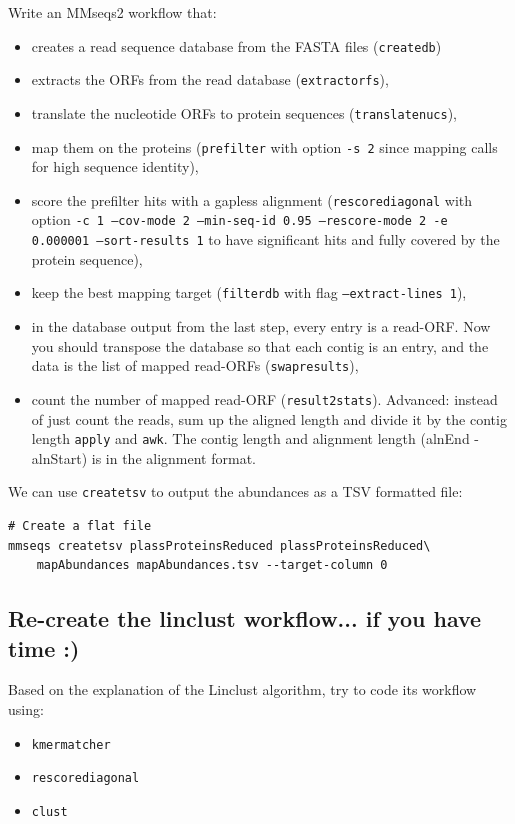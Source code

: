 \documentclass{scrartcl}
\begin{document}
Write an MMseqs2 workflow that:
\begin{itemize}
    \item creates a read sequence database from the FASTA files (\texttt{createdb})
    \item extracts the ORFs from the read database (\texttt{extractorfs}),
    \item translate the nucleotide ORFs to protein sequences (\texttt{translatenucs}),
    \item map them on the proteins (\texttt{prefilter} with option \texttt{-s 2} since mapping calls for high sequence identity),
    \item score the prefilter hits with a gapless alignment (\texttt{rescorediagonal} with option \texttt{-c 1 --cov-mode 2 --min-seq-id 0.95 --rescore-mode 2 -e 0.000001 --sort-results 1} to have significant hits and fully covered by the protein sequence),
    \item keep the best mapping target (\texttt{filterdb} with flag \texttt{--extract-lines 1}),
    \item in the database output from the last step, every entry is a read-ORF. Now you should transpose the database so that each contig is an entry, and the data is the list of mapped read-ORFs (\texttt{swapresults}),
    \item count the number of mapped read-ORF (\texttt{result2stats}). Advanced: instead of just count the reads, sum up the aligned length and divide it by the contig length \texttt{apply} and \texttt{awk}. The contig length and alignment length (alnEnd - alnStart) is in the alignment format.
\end{itemize}

We can use \texttt{createtsv} to output the abundances as a TSV formatted file:
\begin{verbatim}
# Create a flat file
mmseqs createtsv plassProteinsReduced plassProteinsReduced\
    mapAbundances mapAbundances.tsv --target-column 0
\end{verbatim}

\subsection{Re-create the linclust workflow... if you have time :)}

Based on the explanation of the Linclust algorithm, try to code its workflow using:
\begin{itemize}
    \item \texttt{kmermatcher}
    \item \texttt{rescorediagonal}
    \item \texttt{clust}
\end{itemize}
\end{document}
